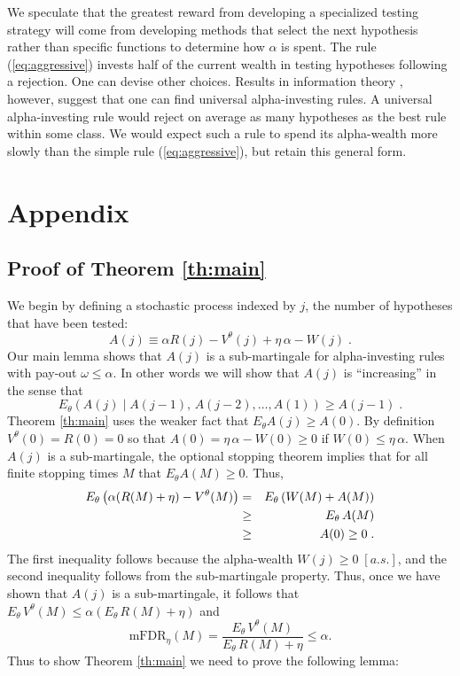 \documentclass[12pt]{article}
\newcommand{\eqn}[1]{(\ref{#1})}
\newcommand{\given}{\; \big| \;}
\begin{document}
We speculate that the greatest reward from developing a specialized
testing strategy will come from developing methods that select the
next hypothesis rather than specific functions to determine how $\alpha$
is spent.  The rule \eqn{eq:aggressive} invests half of the current
wealth in testing hypotheses following a rejection.  One can devise other choices. 
Results in information theory 
\citep{rissanen83, fosterstinewyner02}, however, suggest that one can 
find universal alpha-investing rules.  A universal alpha-investing
rule would reject on average as many hypotheses as the best rule
within some class. We would expect such a rule to spend its
alpha-wealth more slowly than the simple rule
\eqn{eq:aggressive}, but retain this general form.


\section*{Appendix}  

\subsection*{Proof of Theorem \ref{th:main}}

We begin by defining a stochastic process indexed by $j$, the
number of hypotheses that have been tested:
\begin{displaymath}
    A(j) \equiv \alpha R(j) -  V^\theta(j)  +  \eta\,\alpha - W(j) \; .  
\end{displaymath}
Our main lemma shows that $A(j)$ is a sub-martingale for
 alpha-investing rules with pay-out $\omega \le \alpha$.  In other
 words we will show that $A(j)$ is ``increasing'' in the sense that
\begin{displaymath}
  E_\theta\left( A(j) \given A(j-1),\,A(j-2),\ldots, A(1)\right)
  \ge A(j-1) \;.
\end{displaymath}
Theorem \ref{th:main} uses the weaker fact that
 $E_\theta A(j) \ge A(0)$.  By definition $V^\theta(0) = R(0) = 0$ so that
 $A(0) = \eta\,\alpha - W(0) \ge 0$ if $W(0) \le
 \eta\,\alpha$.  When $A(j)$ is a sub-martingale, the optional stopping
 theorem implies that for all finite stopping times $M$ that $E_\theta A(M)
 \ge 0$.  Thus,
\begin{eqnarray*}
E_\theta \left(\alpha (R(M)+\eta) - V^\theta(M) \right)
  & =   &  E_\theta \left(W(M) + A(M) \right) \cr
  & \ge& E_\theta \,A(M)               \cr
  & \ge& A(0) \ge 0 \; .
\end{eqnarray*}
The first inequality follows because the alpha-wealth $W(j) \ge 0 \;
 [a.s.]$, and the second inequality follows from the sub-martingale
 property.  Thus, once we have shown that $A(j)$ is a sub-martingale, it follows
 that $E_\theta \, V^\theta(M)  \le  \alpha (E_\theta\,R(M)+\eta)$ and
\begin{displaymath}
  \mbox{mFDR}_\eta(M) = \frac{E_\theta\,V^\theta(M)}{ E_\theta\,R(M)+\eta}  \le   \alpha.
\end{displaymath}
Thus to show Theorem \ref{th:main} we need to prove the following lemma:
\end{document}
